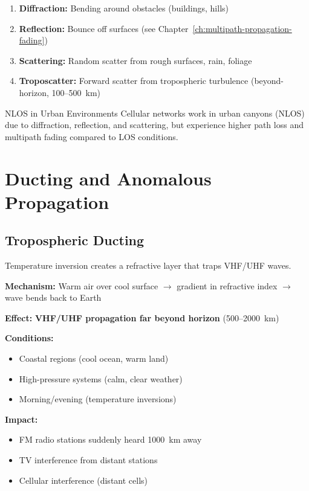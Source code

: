 \begin{enumerate}
\item \textbf{Diffraction:} Bending around obstacles (buildings, hills)
\item \textbf{Reflection:} Bounce off surfaces (see Chapter~\ref{ch:multipath-propagation-fading})
\item \textbf{Scattering:} Random scatter from rough surfaces, rain, foliage
\item \textbf{Troposcatter:} Forward scatter from tropospheric turbulence (beyond-horizon, 100--500~km)
\end{enumerate}

\begin{calloutbox}{NLOS in Urban Environments}
Cellular networks work in urban canyons (NLOS) due to diffraction, reflection, and scattering, but experience higher path loss and multipath fading compared to LOS conditions.
\end{calloutbox}

\section{Ducting and Anomalous Propagation}

\subsection{Tropospheric Ducting}

Temperature inversion creates a refractive layer that traps VHF/UHF waves.

\textbf{Mechanism:} Warm air over cool surface $\rightarrow$ gradient in refractive index $\rightarrow$ wave bends back to Earth

\textbf{Effect:} \textbf{VHF/UHF propagation far beyond horizon} (500--2000~km)

\textbf{Conditions:}
\begin{itemize}
\item Coastal regions (cool ocean, warm land)
\item High-pressure systems (calm, clear weather)
\item Morning/evening (temperature inversions)
\end{itemize}

\textbf{Impact:}
\begin{itemize}
\item FM radio stations suddenly heard 1000~km away
\item TV interference from distant stations
\item Cellular interference (distant cells)
\end{itemize}

